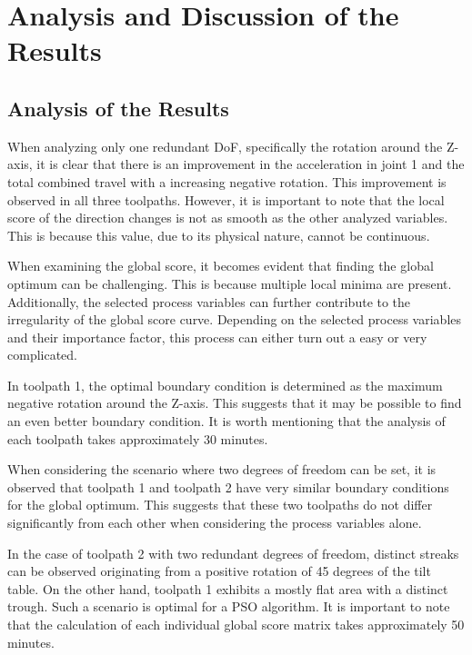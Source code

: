 \newpage
\section{Analysis and Discussion of the Results}%

\subsection{Analysis of the Results}
When analyzing only one redundant \acrshort{DoF}, specifically the rotation around the Z-axis, it is clear that there is an improvement in the acceleration in joint 1 and the total combined travel with a increasing negative rotation. This improvement is observed in all three toolpaths. However, it is important to note that the local score of the direction changes is not as smooth as the other analyzed variables. This is because this value, due to its physical nature, cannot be continuous.

When examining the global score, it becomes evident that finding the global optimum can be challenging. This is because multiple local minima are present. Additionally, the selected process variables can further contribute to the irregularity of the global score curve.
Depending on the selected process variables and their importance factor, this process can either turn out a easy or very complicated.

In toolpath 1, the optimal boundary condition is determined as the maximum negative rotation around the Z-axis. This suggests that it may be possible to find an even better boundary condition.
It is worth mentioning that the analysis of each toolpath takes approximately 30 minutes.


When considering the scenario where two degrees of freedom can be set, it is observed that toolpath 1 and toolpath 2 have very similar boundary conditions for the global optimum. This suggests that these two toolpaths do not differ significantly from each other when considering the process variables alone.

In the case of toolpath 2 with two redundant degrees of freedom, distinct streaks can be observed originating from a positive rotation of 45 degrees of the tilt table.
On the other hand, toolpath 1 exhibits a mostly flat area with a distinct trough. Such a scenario is optimal for a \acrshort{PSO} algorithm.
It is important to note that the calculation of each individual global score matrix takes approximately 50 minutes. 



